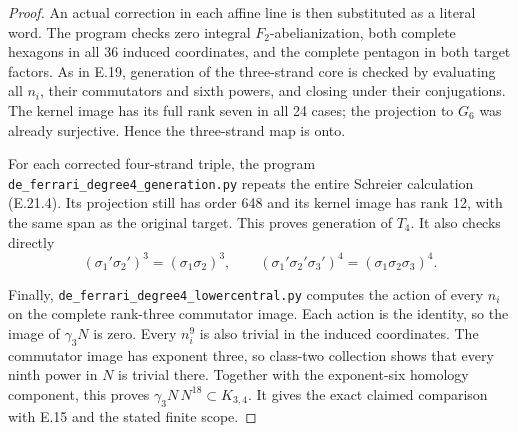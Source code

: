 \begin{proof}
An actual correction in each
affine line is then substituted
as a literal word. The program
checks zero integral
$F_2$-abelianization, both
complete hexagons in all
36 induced coordinates, and
the complete pentagon in both
target factors. As in E.19,
generation of the three-strand
core is checked by evaluating
all $n_i$, their commutators
and sixth powers, and closing
under their conjugations. The
kernel image has its full
rank seven in all 24 cases;
the projection to $G_6$ was
already surjective. Hence the
three-strand map is onto.

For each corrected four-strand
triple, the program
\texttt{de\_ferrari\_degree4\_generation.py}
repeats the entire Schreier
calculation (E.21.4). Its
projection still has order
648 and its kernel image has
rank 12, with the same span
as the original target. This
proves generation of $T_4$.
It also checks directly
\[
 (\sigma_1'\sigma_2')^3=(\sigma_1\sigma_2)^3,
 \qquad
 (\sigma_1'\sigma_2'\sigma_3')^4
       =(\sigma_1\sigma_2\sigma_3)^4.
\]

Finally,
\texttt{de\_ferrari\_degree4\_lowercentral.py}
computes the action of every
$n_i$ on the complete rank-three
commutator image. Each action
is the identity, so the image
of $\gamma_3N$ is zero. Every
$n_i^9$ is also trivial in the
induced coordinates. The
commutator image has exponent
three, so class-two collection
shows that every ninth power
in $N$ is trivial there.
Together with the exponent-six
homology component, this proves
$\gamma_3N\,N^{18}\subset K_{3,4}$.
It gives the exact claimed
comparison with E.15 and the
stated finite scope.
\end{proof}
